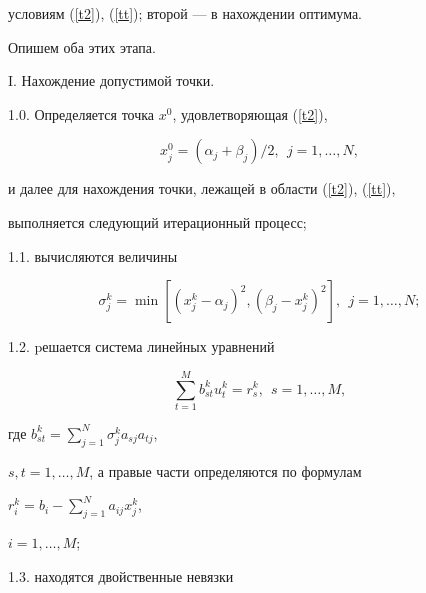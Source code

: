 условиям (\ref{t2}), (\ref{tt}); второй --- в нахождении оптимума.


Опишем оба этих этапа.





I. Нахождение допустимой точки.





1.0. Определяется точка $x^0$, удовлетворяющая (\ref{t2}),


\begin{equation}\label{b1}


x^{0}_{j}=(\alpha_{j}+\beta_{j})/2, \ \ j= 1,\dotsc,N,


\end{equation}


и далее для нахождения точки, лежащей в области (\ref{t2}), (\ref{tt}),


выполняется следующий итерационный процесс;





1.1.\label{item11} вычисляются величины


\begin{equation}\label{b2}


\sigma^{k}_{j}=\min[(x^{k}_{j}-\alpha_{j})^{2},


(\beta_{j}-x^{k}_{j})^{2}], \ \ j = 1,\dotsc,N;


\end{equation}





1.2.\label{item12} pешается система линейных уравнений


\begin{equation}\label{SLU}


\sum\limits_{t=1}^ Mb^{k}_{st}u_t^k=r_{s}^{k},


\ \ s = 1,\dotsc,M,


\end{equation}


где $b^{k}_{st}=\sum\limits_{j=1}^N\sigma_{j}^{k}a_{sj}a_{tj}$,


$s,t = 1,\dotsc,M$, а правые части определяются по формулам


$r^{k}_{i}=b_{i}-\sum\limits_{j=1}^Na_{ij}x^{k}_{j}$,


$i = 1,\dotsc,M$;





1.3. находятся двойственные невязки



